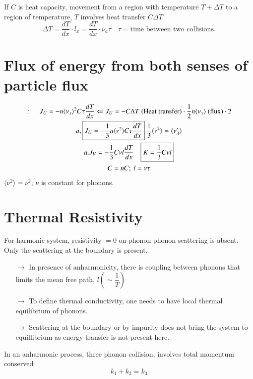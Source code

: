 If $C$ is heat capacity, movement from a region with temperature $T+\Delta T$ to a region of temperature, $T$ involves heat transfer $C\Delta T$
$$
\Delta T = \dfrac{dT}{dx}\cdot l_{x}=\dfrac{dT}{dx}\cdot \nu_{a}\tau\quad \tau=\text{time between two collisions.}
$$

\section*{Flux of energy from both senses of particle flux}
\begin{gather*}
\therefore\quad J_{U}=-n\langle \nu_{x}\rangle^{2}C\tau \dfrac{dT}{dx}\Leftarrow J_{U}=-C\Delta T\text{ (Heat transfer)}\cdot \frac{1}{2}n\langle \nu_{x}\rangle \text{ (flux)} \cdot 2\\
a, \fbox{$J_{U}=-\dfrac{1}{3}n\langle \nu^{2}\rangle C\tau \dfrac{dT}{dx}$} \ \dfrac{1}{3}\langle \nu^{2}\rangle =\langle \nu^{r}_{\lambda}\rangle\\
a. J_{V}= -\dfrac{1}{3}C\nu l \dfrac{dT}{dx}\quad \fbox{$K=\dfrac{1}{3}C\nu l$}\\
C=nC; \ l=\nu\tau
\end{gather*}
$\langle \nu^{2}\rangle=\nu^{2}$; $\nu$ is constant for phonons.

\section*{Thermal Resistivity}

For harmonic system, resistivity $=0$ on phonon-phonon scattering is absent. Only the scattering at the boundary is present.
\begin{itemize}
\item[$\to$] In presence of anharmonicity, there is coupling between phonons that limits the mean free path, $l\left(\sim \dfrac{1}{T}\right)$

\item[$\to$] To define thermal conductivity, one needs to have local thermal equilibrium of phonons.

\item[$\to$] Scattering at the boundary or by impurity does not bring the system to equillibrium as energy transfer is not present here.
\end{itemize}
In an anharmonic process, three phonon collision, involves total momentum conserved
\begin{equation*}
k_{1}+k_{2}=k_{3}\tag{A}\label{lec20-eqA}
\end{equation*}

